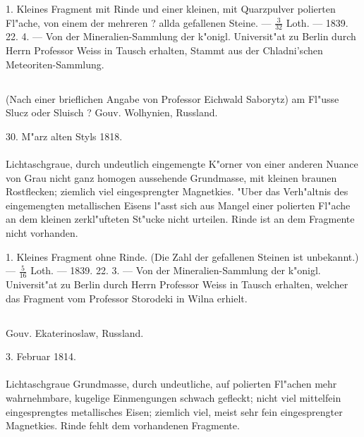 \documentclass[a4paper, 11pt, oneside, polutonikogreek, german]{article}
\begin{document}
1. Kleines Fragment mit Rinde und einer kleinen, mit Quarzpulver polierten Fl"ache, von einem der mehreren ? allda gefallenen Steine. --- $\frac{3}{32}$ Loth. --- 1839. 22. 4. --- Von der Mineralien-Sammlung der k"onigl. Universit"at zu Berlin durch Herrn Professor Weiss in Tausch erhalten, Stammt aus der Chladni'schen Meteoriten-Sammlung.
\subsection{}
\begin{center}

(Nach einer brieflichen Angabe von Professor Eichwald Saborytz) am Fl"usse Slucz oder Sluisch ? Gouv. Wolhynien, Russland.

30. M"arz alten Styls 1818.
\end{center}
\paragraph{}
Lichtaschgraue, durch undeutlich eingemengte K"orner von einer anderen Nuance von Grau nicht ganz homogen aussehende Grundmasse, mit kleinen braunen Rostflecken; ziemlich viel eingesprengter Magnetkies. "Uber das Verh"altnis des eingemengten metallischen Eisens l"asst sich aus Mangel einer polierten Fl"ache an dem kleinen zerkl"ufteten St"ucke nicht urteilen. Rinde ist an dem Fragmente nicht vorhanden.

1. Kleines Fragment ohne Rinde. (Die Zahl der gefallenen Steinen ist unbekannt.) --- $\frac{5}{16}$ Loth. --- 1839. 22. 3. --- Von der Mineralien-Sammlung der k"onigl. Universit"at zu Berlin durch Herrn Professor Weiss in Tausch erhalten, welcher das Fragment vom Professor Storodeki in Wilna erhielt.
\subsection{}
\begin{center}

Gouv. Ekaterinoslaw, Russland.

3. Februar 1814.
\end{center}
\paragraph{}
Lichtaschgraue Grundmasse, durch undeutliche, auf polierten Fl"achen mehr wahrnehmbare, kugelige Einmengungen schwach gefleckt; nicht viel mittelfein eingesprengtes metallisches Eisen; ziemlich viel, meist sehr fein eingesprengter Magnetkies. Rinde fehlt dem vorhandenen Fragmente.
\end{document}
